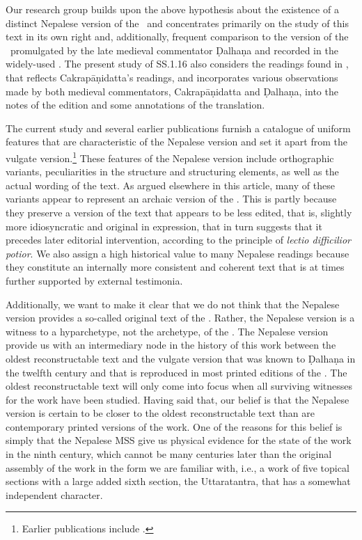 Our research group builds upon the above hypothesis about the existence of a
distinct Nepalese version of the \SS\ and concentrates primarily on the study of
this text in its own right and, additionally, frequent comparison to the version
of the \SS\ promulgated by the late medieval commentator Ḍalhaṇa and recorded in
the widely-used \cite{vulgate}.  The present study of SS.1.16 also considers the
readings found in \cite{acar-1939}, that reflects Cakrapāṇidatta's readings, and
incorporates various observations made by both medieval commentators,
Cakrapāṇidatta and Ḍalhaṇa, into the notes of the edition and some annotations of
the translation. 

The current study and several earlier publications furnish a catalogue of uniform
features that are characteristic of the Nepalese version and set it apart from the
vulgate version.\footnote{ Earlier publications include
    \cite{hari-2011,wuja-2013,birc-2021,birc-2021a}.} These features of the Nepalese
    version include orthographic variants, peculiarities in the structure and
    structuring elements, as well as the actual wording of the text. As argued
    elsewhere in this article, many of these variants appear to represent an archaic
    version of the \SS.  This is partly because they preserve a version of the text
    that appears to be less edited, that is, slightly more idiosyncratic and original
    in expression, that in turn suggests that it precedes later editorial
    intervention, according to the principle of \emph{lectio difficilior potior}. We
    also assign a high historical value to many Nepalese readings  because they
    constitute an internally more consistent and coherent text that is at times
    further supported by external testimonia.

Additionally, we want to make it clear that we do not think that the Nepalese
version provides a so-called original text of the \SS.  Rather, the Nepalese
version is a witness to a hyparchetype, not the archetype, of the \SS.  The
Nepalese version provide us with an intermediary node in the history of this work
between the oldest reconstructable text and the vulgate version that was known to
Ḍalhaṇa in the twelfth century and that is reproduced in most printed editions of
the \SS.  The oldest reconstructable text will only come into focus when all
surviving witnesses for the work have been studied.  Having said that, our belief is
that the Nepalese version is certain to be closer to the oldest reconstructable
text than are contemporary printed versions of the work.  One of the reasons for
this belief is simply that the Nepalese MSS give us physical evidence for the
state of the work in the ninth century, which cannot be many centuries later than
the original assembly of the work in the form we are familiar with, i.e., a work
of five topical sections with a large added sixth section, the Uttaratantra, that
has a somewhat independent character. 

